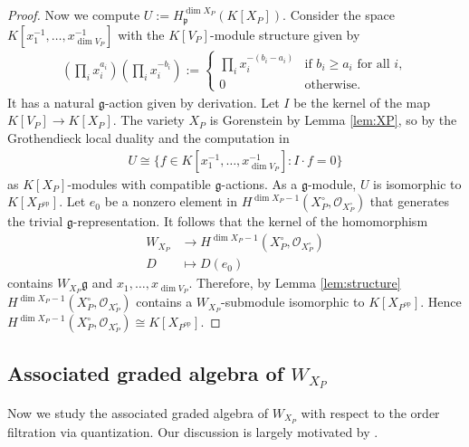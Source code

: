 \documentclass[11pt,a4paper,usenames,dvipsnames,reqno]{amsart}
\numberwithin{equation}{section}
\theoremstyle{definition}
\theoremstyle{remark}
\begin{document}
\begin{proof}
    Now we compute $U:=H^{\dim X_P}_\mathfrak{p}(K[X_P]).$ Consider the space $K[x_1^{-1},\ldots, x_{\dim V_P}^{-1}]$ with the $K[V_P]$-module structure given by 
    \begin{align*}
        \left(\prod_{i} x_i^{a_i}\right) \left(\prod_{i} x_i^{-b_i}\right):=\begin{cases}
            \prod_{i} x_i^{-(b_i-a_i)} & \textrm{if } b_i\ge a_i \textrm{ for all }i,\\
            0& \textrm{otherwise.}
        \end{cases}
    \end{align*}
    It has a natural $\mathfrak{g}$-action given by derivation. Let $I$ be the kernel of the map $K[V_P]\to K[X_P]$. The variety $X_P$ is Gorenstein by Lemma \ref{lem:XP}, so by the Grothendieck local duality \cite[\href{https://stacks.math.columbia.edu/tag/0AAK}{Tag 0AAK}]{stacks-project} and the computation in \cite{Matsumura:injectivehull}
    \begin{align*}
        U\cong \{ f\in K[x_1^{-1},\ldots, x_{\dim V_P}^{-1}]: I\cdot f=0\}
    \end{align*}
    as $K[X_P]$-modules with compatible $\mathfrak{g}$-actions. As a $\mathfrak{g}$-module, $U$ is isomorphic to $K[X_{P^{\mathrm{op}}}].$ 
    Let $e_0$ be a nonzero element in $H^{\dim X_P-1}(X_P^\circ,\mathcal{O}_{X_P^\circ})$ that generates the trivial $\mathfrak{g}$-representation. It follows that the kernel of the homomorphism
    \begin{align*}
        W_{X_P}&\to H^{\dim X_P-1}(X_P^\circ,\mathcal{O}_{X_P^\circ})\\
            D&\mapsto D(e_0)
    \end{align*}
    contains $W_{X_P}\mathfrak{g}$ and $x_1,\ldots, x_{\dim V_P}.$ Therefore, by Lemma \ref{lem:structure} $H^{\dim X_P-1}(X_P^\circ,\mathcal{O}_{X_P^\circ})$ contains a $W_{X_P}$-submodule isomorphic to $K[X_{P^{\mathrm{op}}}]$. Hence $H^{\dim X_P-1}(X_P^\circ,\mathcal{O}_{X_P^\circ})\cong K[X_{P^{\mathrm{op}}}]$.
\end{proof}

\subsection{Associated graded algebra of $W_{X_P}$}

Now we study the associated graded algebra of $W_{X_P}$ with respect to the order filtration via quantization. Our discussion is largely motivated by \cite{GR:basic}. 
\end{document}
